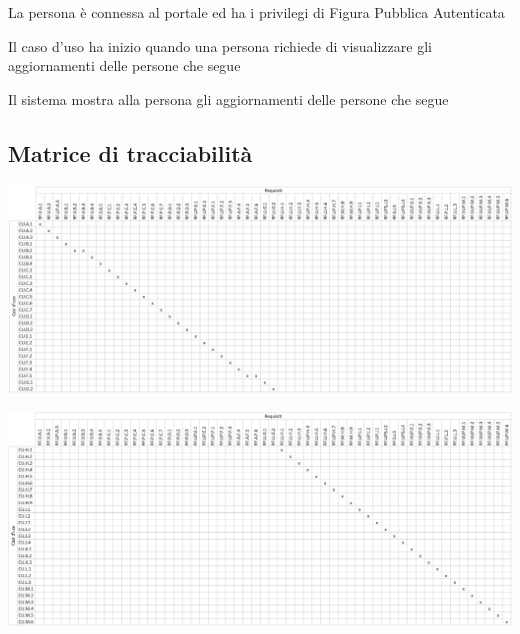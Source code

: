 
%

{}
{La persona è connessa al portale ed ha i privilegi di Figura Pubblica Autenticata}
{\postNulle}
{\begin{enumCU}
	\item Il caso d'uso ha inizio quando una persona richiede di visualizzare gli aggiornamenti delle persone che segue
	\item Il sistema mostra alla persona gli aggiornamenti delle persone che segue
\end{enumCU}}

\begin{landscape}
\section{Matrice di tracciabilità}
\begin{center}
	\includegraphics[width=\linewidth]{assets/matricetracciabilita0}
\end{center}
\end{landscape}

\begin{landscape}
\begin{center}
	\includegraphics[width=\linewidth]{assets/matricetracciabilita1}
\end{center}
\end{landscape}

